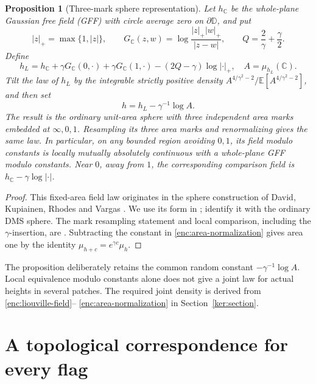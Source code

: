 \documentclass[11pt]{article}
\numberwithin{equation}{section}
\newtheorem{proposition}[theorem]{Proposition}
\theoremstyle{definition}
\theoremstyle{remark}
\newcommand{\C}{\mathbb C}
\newcommand{\EE}{\mathbb E}
\newcommand{\1}{\mathbf 1}
\begin{document}
\begin{proposition}[Three-mark sphere representation]
\label{enc:sphere-representation}
Let $h_{\C}$ be the whole-plane Gaussian free field (GFF) with circle average zero on
$\partial\mathbb D$, and put
\[
 |z|_+=\max\{1,|z|\},\qquad
 G_{\C}(z,w)=\log\frac{|z|_+|w|_+}{|z-w|},\qquad
 Q=\frac2\gamma+\frac\gamma2.
\]
Define
\begin{equation}\label{enc:liouville-field}
 h_L=h_{\C}+\gamma G_{\C}(0,\cdot)+\gamma G_{\C}(1,\cdot)
       -(2Q-\gamma)\log|\cdot|_+,
 \quad A=\mu_{h_L}(\C).
\end{equation}
Tilt the law of $h_L$ by the integrable strictly positive density
$A^{4/\gamma^2-2}/\EE[A^{4/\gamma^2-2}]$, and then set
\begin{equation}\label{enc:area-normalization}
 h=h_L-\gamma^{-1}\log A.
\end{equation}
The result is the ordinary unit-area sphere with three independent
area marks embedded at $\infty,0,1$.  Resampling its three area marks and
renormalizing gives the same law.  In particular, on any bounded region
avoiding $0,1$, its field modulo constants is locally mutually absolutely
continuous with a whole-plane GFF modulo constants.  Near $0$, away from
$1$, the corresponding comparison field is $h_{\C}-\gamma\log|\cdot|$.
\end{proposition}

\begin{proof}
This fixed-area field law originates in the sphere construction of
David, Kupiainen, Rhodes and Vargas
\citep[Section~3.3, Proposition~3.8 and Section~3.4]{DKRVSphere2016}.
We use its form in \citet[Definition~2.2]{BorgaGwynneSunPermutons};
\citet[Theorem~1.1 and Remark~1.2]{AruHuangSunSphere} identify it with
the ordinary DMS sphere.
The mark resampling statement and local comparison, including the
$\gamma$-insertion, are \cite[Lemmas 2.3--2.4]{BorgaGwynneSunPermutons}.
Subtracting the constant in \eqref{enc:area-normalization} gives area one
by the identity $\mu_{h+c}=e^{\gamma c}\mu_h$.
\end{proof}

The proposition deliberately retains the common random constant
$-\gamma^{-1}\log A$.  Local equivalence modulo constants alone does not
give a joint law for actual heights in several patches.  The required
joint density is derived from \eqref{enc:liouville-field}--
\eqref{enc:area-normalization} in Section~\ref{ker:section}.

\section{A topological correspondence for every flag}
\label{top:section}
\end{document}
